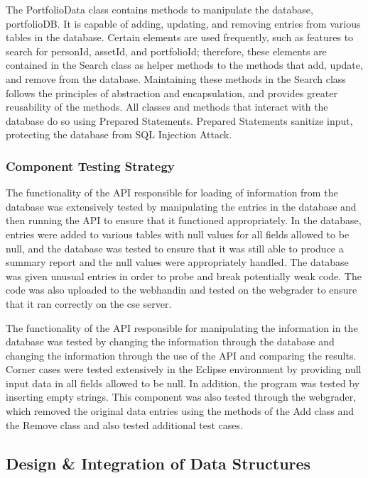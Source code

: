 \documentclass[12pt]{scrartcl} %
\begin{document}
    The PortfolioData class contains methods to manipulate the database, portfolioDB.  It is capable of adding, updating, and removing entries from various tables in the database.  Certain elements are used frequently, such as features to search for personId, assetId, and portfolioId; therefore, these elements are contained in the Search class as helper methods to the methods that add, update, and remove from the database.  Maintaining these methods in the Search class follows the principles of abstraction and encapsulation, and provides greater reusability of the methods.  All classes and methods that interact with the database do so using Prepared Statements.  Prepared Statements sanitize input, protecting the database from SQL Injection Attack.

    \subsubsection{Component Testing Strategy}

    The functionality of the API responsible for loading of information from the database was extensively tested by manipulating the entries in the database and then running the API to ensure that it functioned appropriately.  In the database, entries were added to various tables with null values for all fields allowed to be null, and the database was tested to ensure that it was still able to produce a summary report and the null values were appropriately handled.  The database was given unusual entries in order to probe and break potentially weak code.  The code was also uploaded to the webhandin and tested on the webgrader to ensure that it ran correctly on the cse server.

    The functionality of the API responsible for manipulating the information in the database was tested by changing the information through the database and changing the information through the use of the API and comparing the results.  Corner cases were tested extensively in the Eclipse environment by providing null input data in all fields allowed to be null.  In addition, the program was tested by inserting empty strings.  This component was also tested through the webgrader, which removed the original data entries using the methods of the Add class and the Remove class and also tested additional test cases.

    \subsection{Design \& Integration of Data Structures}
\end{document}
